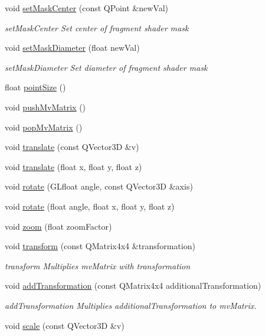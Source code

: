 \begin{DoxyCompactItemize}
void \mbox{\hyperlink{class_g_l_e_s_renderer_aa41f49d92c3514ce90a354cd2127d1c5}{set\+Mask\+Center}} (const Q\+Point \&new\+Val)
\begin{DoxyCompactList}\small\item\em set\+Mask\+Center Set center of fragment shader mask \end{DoxyCompactList}\item 
void \mbox{\hyperlink{class_g_l_e_s_renderer_a07c9bfdc4f16745e9b09529e21184910}{set\+Mask\+Diameter}} (float new\+Val)
\begin{DoxyCompactList}\small\item\em set\+Mask\+Diameter Set diameter of fragment shader mask \end{DoxyCompactList}\item 
float \mbox{\hyperlink{class_g_l_e_s_renderer_a2ba82f565d0a34259614448407cdad11}{point\+Size}} ()
\item 
void \mbox{\hyperlink{class_g_l_e_s_renderer_a712dddd10f14f80a003a347ff1aa1666}{push\+Mv\+Matrix}} ()
\item 
void \mbox{\hyperlink{class_g_l_e_s_renderer_a93ddfbce8f107b0cbc41b2854855202d}{pop\+Mv\+Matrix}} ()
\item 
void \mbox{\hyperlink{class_g_l_e_s_renderer_a252caaa926c2e86312b219454492ffe0}{translate}} (const Q\+Vector3D \&v)
\item 
void \mbox{\hyperlink{class_g_l_e_s_renderer_a45f1e6f0154b7887289fd8a3aa22908f}{translate}} (float x, float y, float z)
\item 
void \mbox{\hyperlink{class_g_l_e_s_renderer_a9e034d2d95eedc35a56f8db1688df163}{rotate}} (G\+Lfloat angle, const Q\+Vector3D \&axis)
\item 
void \mbox{\hyperlink{class_g_l_e_s_renderer_a4e51b730376db41ff15b4a976b258c6e}{rotate}} (float angle, float x, float y, float z)
\item 
void \mbox{\hyperlink{class_g_l_e_s_renderer_a43e69a0a8c38adf1faae474c33fb7bb8}{zoom}} (float zoom\+Factor)
\item 
void \mbox{\hyperlink{class_g_l_e_s_renderer_a8d8a2bac71c26f834b7ce7983204e870}{transform}} (const Q\+Matrix4x4 \&transformation)
\begin{DoxyCompactList}\small\item\em transform Multiplies mv\+Matrix with transformation \end{DoxyCompactList}\item 
void \mbox{\hyperlink{class_g_l_e_s_renderer_a5a523cfef1b63258e863af159c04c235}{add\+Transformation}} (const Q\+Matrix4x4 additional\+Transformation)
\begin{DoxyCompactList}\small\item\em add\+Transformation Multiplies additional\+Transformation to mv\+Matrix. \end{DoxyCompactList}\item 
void \mbox{\hyperlink{class_g_l_e_s_renderer_a4bd22f2f738b185f3b6c3e381c58feca}{scale}} (const Q\+Vector3D \&v)
\end{DoxyCompactItemize}

